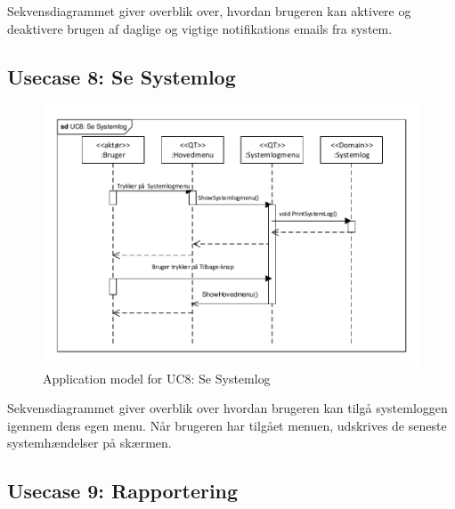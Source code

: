 Sekvensdiagrammet giver overblik over, hvordan brugeren kan aktivere og deaktivere brugen af daglige og vigtige notifikations emails fra system.

\clearpage

\subsection{Usecase 8: Se Systemlog}

\begin{figure}[!h]
\centering 
\includegraphics[width={\textwidth}, trim=0 0 0 0, clip=true] {../fig/SD_autogreen_UC_8_Se_Systemlog.pdf}
\caption{Application model for UC8: Se Systemlog}
\label{fig:SD_UC8}
\end{figure}

Sekvensdiagrammet giver overblik over hvordan brugeren kan tilgå systemloggen igennem dens egen menu. Når brugeren har tilgået menuen, udskrives de seneste systemhændelser på skærmen.

\clearpage

\subsection{Usecase 9: Rapportering}

